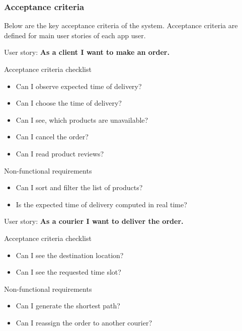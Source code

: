 \documentclass[../main.tex]{subfiles}
\begin{document}
\subsubsection{Acceptance criteria}

Below are the key acceptance criteria of the system. Acceptance criteria are defined for main user stories of each app user.

\vspace{3mm}
\newpage
\begin{oframed}
    User story: \textbf{As a client I want to make an order.}
    
    Acceptance criteria checklist
    \begin{itemize}
        \item Can I observe expected time of delivery?
        \item Can I choose the time of delivery?
        \item Can I see, which products are unavailable?
        \item Can I cancel the order?
        \item Can I read product reviews?
    \end{itemize}
    Non-functional requirements
    \begin{itemize}
        \item Can I sort and filter the list of products?
        \item Is the expected time of delivery computed in real time?
    \end{itemize}
\end{oframed}
\vspace{5mm}
\begin{oframed}
    User story: \textbf{As a courier I want to deliver the order.}
    
    Acceptance criteria checklist
    \begin{itemize}
        \item Can I see the destination location?
        \item Can I see the requested time slot?
    \end{itemize}
    Non-functional requirements
    \begin{itemize}
        \item Can I generate the shortest path?
        \item Can I reassign the order to another courier?
    \end{itemize}
\end{oframed}
\vspace{5mm}
\end{document}
